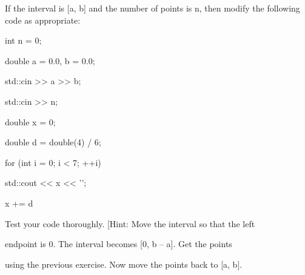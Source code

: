 If the interval is [a, b] and the number of points is n, then modify the following code as appropriate:

\begin{console}

int n = 0;

double a = 0.0, b = 0.0;

std::cin >> a >> b;

std::cin >> n;



double x = 0;

double d = double(4) / 6;

for (int i = 0; i < 7; ++i)

{   

    std::cout << x << '\n';

    x += d

}

\end{console}

Test your code thoroughly. [Hint: Move the interval so that the left

endpoint is 0. The interval becomes [0, b -- a]. Get the points

using the previous exercise. Now move the points back to [a, b].

